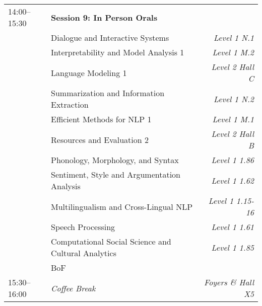 \begin{xltabular}{\linewidth}{l X r}
    14:00--15:30    &   \textbf{Session 9: In Person Orals}   &   \\
    &   Dialogue and Interactive Systems   &   \textit{Level 1 N.1} \\
    &   Interpretability and Model Analysis 1  &   \textit{Level 1 M.2} \\
    &   Language Modeling 1  &   \textit{Level 2 Hall C} \\
    &   Summarization and Information Extraction  &   \textit{Level 1 N.2} \\
    &   Efficient Methods for NLP 1  &   \textit{Level 1 M.1} \\
    &   Resources and Evaluation 2  &   \textit{Level 2 Hall B} \\
    &   Phonology, Morphology, and Syntax  &   \textit{Level 1 1.86} \\
    &   Sentiment, Style and Argumentation Analysis  &   \textit{Level 1 1.62} \\
    &   Multilingualism and Cross-Lingual NLP  &   \textit{Level 1 1.15-16} \\
    &   Speech Processing   &   \textit{Level 1 1.61} \\
    &   Computational Social Science and Cultural Analytics  &   \textit{Level 1 1.85} \\
    &   BoF &   \\

    15:30--16:00    &   \textit{Coffee Break}    &  \textit{Foyers \& Hall X5} \\


\end{xltabular}
